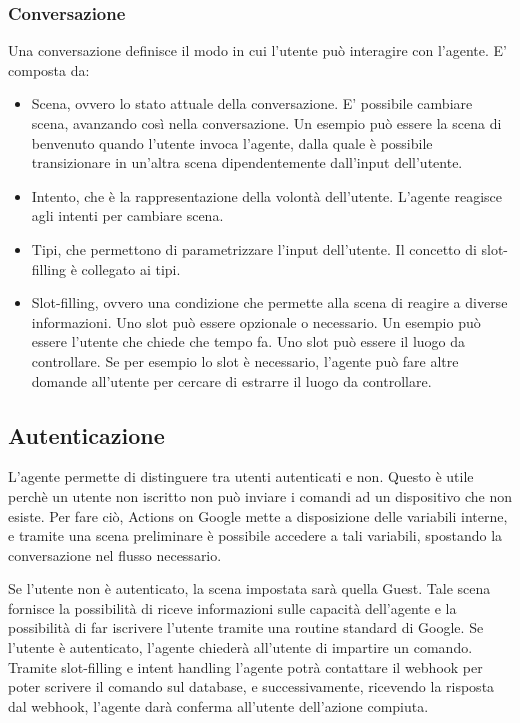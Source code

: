 \subsubsection{Conversazione}
Una conversazione definisce il modo in cui l'utente può interagire con l'agente. E' composta da:
\begin{itemize}
    \item Scena, ovvero lo stato attuale della conversazione. E' possibile cambiare scena, avanzando così nella conversazione. Un esempio può essere la scena di benvenuto quando l'utente invoca l'agente, dalla quale è possibile transizionare in un'altra scena dipendentemente dall'input dell'utente.
    \item Intento, che è la rappresentazione della volontà dell'utente. L'agente reagisce agli intenti per cambiare scena.
    \item Tipi, che permettono di parametrizzare l'input dell'utente. Il concetto di slot-filling è collegato ai tipi.
    \item Slot-filling, ovvero una condizione che permette alla scena di reagire a diverse informazioni. 
    Uno slot può essere opzionale o necessario. Un esempio può essere l'utente che chiede che tempo fa. 
    Uno slot può essere il luogo da controllare. Se per esempio lo slot è necessario, l'agente può fare altre domande all'utente per cercare di estrarre il luogo da controllare.
\end{itemize}

\subsection{Autenticazione}
L'agente permette di distinguere tra utenti autenticati e non. Questo è utile perchè un utente non iscritto non può inviare i comandi ad un dispositivo che non esiste. 
Per fare ciò, Actions on Google mette a disposizione delle variabili interne, e tramite una scena preliminare è possibile accedere a tali variabili, spostando la conversazione nel flusso necessario. 

Se l'utente non è autenticato, la scena impostata sarà quella Guest. Tale scena fornisce la possibilità di riceve informazioni sulle capacità dell'agente e la possibilità di far iscrivere l'utente tramite una routine standard di Google.
Se l'utente è autenticato, l'agente chiederà all'utente di impartire un comando. 
Tramite slot-filling e intent handling l'agente potrà contattare il webhook per poter scrivere il comando sul database, e successivamente, ricevendo la risposta dal webhook, l'agente darà conferma all'utente dell'azione compiuta.

